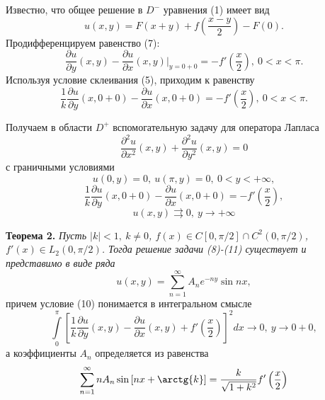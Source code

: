 \documentclass{beamer}
\begin{document}
\begin{frame}
		Известно, что общее решение в $D^{-}$  уравнения (1) имеет вид 
	\begin{equation}
		u(x,y) = F(x+y) + f(\dfrac{x-y}{2}) - F(0).
	\end{equation}
	Продифференцируем равенство (7):
	\begin{equation*}
		\dfrac{\partial u}{\partial y}(x,y) - \dfrac{\partial u}{\partial x}(x,y) \vert_{y=0+0} = -f'\left(\dfrac{x}2\right), \ 0 < x < \pi.
	\end{equation*}
	Используя условие склеивания (5), приходим к равенству
	\begin{equation*}
		\dfrac{1}{k} \dfrac{\partial u}{\partial y}(x, 0+0) - \dfrac{\partial u}{\partial x}(x, 0 + 0) = - f'\left(\dfrac{x}2\right), \ 0 < x < \pi. 
	\end{equation*}
	

\end{frame}
\begin{frame}
		Получаем в области $D^{+}$ вспомогательную задачу для оператора Лапласа 
	\begin{equation}
		\dfrac{\partial^2 u}{\partial x^2}(x,y) + \dfrac{\partial^2 u}{\partial y^2}(x,y) = 0
	\end{equation}
	с граничными условиями 
	\begin{equation}
		u(0,y) = 0, \ u(\pi, y) = 0, \ 0 < y < +\infty, 
	\end{equation}
	\begin{equation}
		\dfrac{1}{k} \dfrac{\partial u}{\partial y}(x,0+0) - \dfrac{\partial u}{\partial x}(x,0+0) = -f'\left(\dfrac{x}{2}\right),
	\end{equation}
	\begin{equation}
		u(x,y) \rightrightarrows 0, \ y \to +\infty 
	\end{equation}
\end{frame}
\begin{frame}
		\textbf{Теорема 2.} \textit{Пусть $|k| < 1, \ k \neq 0$, $f(x) \in C[0, \pi/2] \cap C^2(0, \pi/2)$, $f'(x) \in L_2(0, \pi/2)$. Тогда решение задачи (8)-(11) существует и представимо в виде ряда
			\begin{equation}
				u(x,y) = \sum\limits_{n=1}^{\infty} A_n e^{-ny} \sin{nx},
		\end{equation}}
		причем условие (10) понимается в интегральном смысле
		\begin{equation*}
			\int\limits_0^\pi \left[	\dfrac{1}{k} \dfrac{\partial u}{\partial y}(x,y) - \dfrac{\partial u}{\partial x}(x,y) + f'\left(\dfrac{x}{2}\right)\right]^2 dx \to 0, \ y \to 0 + 0,
		\end{equation*}
		а коэффициенты $A_n$ определяется из равенства
		\begin{equation}
			\sum\limits_{n=1}^{\infty} n A_n \sin{\left[nx + \arctg{k}\right]} = \dfrac{k}{\sqrt{1 + k^2}} f'\left(\dfrac{x}{2}\right) 
		\end{equation}
\end{frame}
\end{document}
